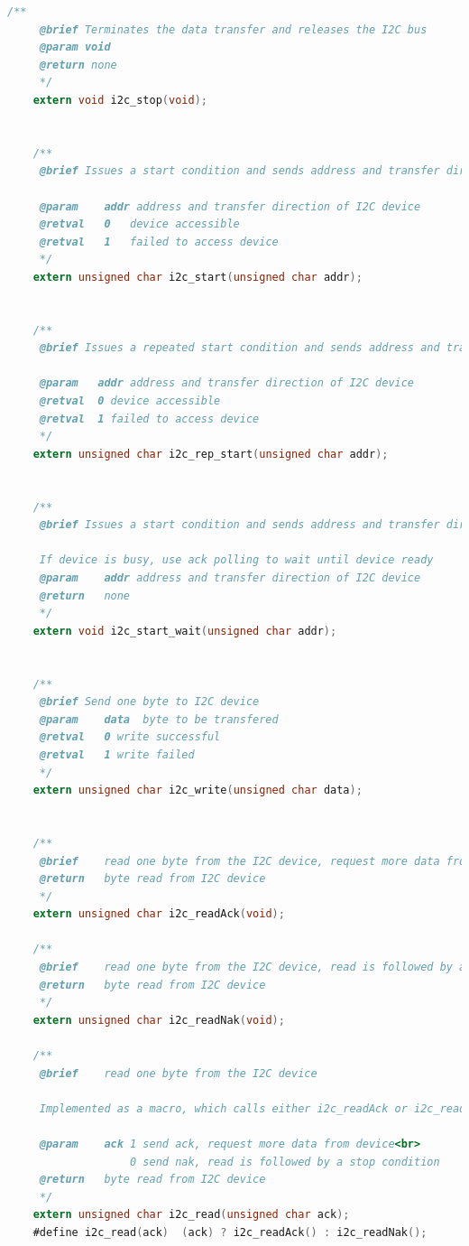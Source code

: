 \documentclass{article}
\numberwithin{figure}{section}
\numberwithin{equation}{section}
\begin{document}
{\begin{lstlisting}[language=C,label=lst:i2cmaster.h,caption=i2cmaster.h]
    /**
     @brief Terminates the data transfer and releases the I2C bus
     @param void
     @return none
     */
    extern void i2c_stop(void);


    /**
     @brief Issues a start condition and sends address and transfer direction

     @param    addr address and transfer direction of I2C device
     @retval   0   device accessible
     @retval   1   failed to access device
     */
    extern unsigned char i2c_start(unsigned char addr);


    /**
     @brief Issues a repeated start condition and sends address and transfer direction

     @param   addr address and transfer direction of I2C device
     @retval  0 device accessible
     @retval  1 failed to access device
     */
    extern unsigned char i2c_rep_start(unsigned char addr);


    /**
     @brief Issues a start condition and sends address and transfer direction

     If device is busy, use ack polling to wait until device ready
     @param    addr address and transfer direction of I2C device
     @return   none
     */
    extern void i2c_start_wait(unsigned char addr);


    /**
     @brief Send one byte to I2C device
     @param    data  byte to be transfered
     @retval   0 write successful
     @retval   1 write failed
     */
    extern unsigned char i2c_write(unsigned char data);


    /**
     @brief    read one byte from the I2C device, request more data from device
     @return   byte read from I2C device
     */
    extern unsigned char i2c_readAck(void);

    /**
     @brief    read one byte from the I2C device, read is followed by a stop condition
     @return   byte read from I2C device
     */
    extern unsigned char i2c_readNak(void);

    /**
     @brief    read one byte from the I2C device

     Implemented as a macro, which calls either i2c_readAck or i2c_readNak

     @param    ack 1 send ack, request more data from device<br>
                   0 send nak, read is followed by a stop condition
     @return   byte read from I2C device
     */
    extern unsigned char i2c_read(unsigned char ack);
    #define i2c_read(ack)  (ack) ? i2c_readAck() : i2c_readNak();



\end{lstlisting}}
\end{document}
